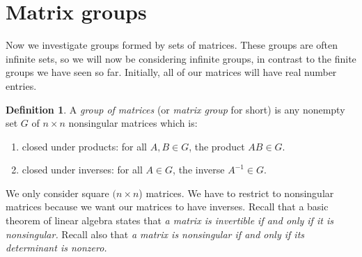 \documentclass[11pt]{article}
\theoremstyle{definition}
\newtheorem{defn}[thm]{Definition}
\begin{document}
\setcounter{section}{13}


\section{Matrix groups}\noindent
Now we investigate groups formed by sets of matrices. These groups are
often infinite sets, so we will now be considering infinite groups, in
contrast to the finite groups we have seen so far. Initially, all of
our matrices will have real number entries.

\begin{defn}
  A \emph{group of matrices} (or \emph{matrix group} for short) is any
  nonempty set $G$ of $n \times n$ nonsingular matrices which is:
  \begin{enumerate}
  \item closed under products: for all $A,B \in G$, the product $AB
    \in G$.
  \item closed under inverses: for all $A \in G$, the inverse $A^{-1}
    \in G$.
  \end{enumerate}
\end{defn}

We only consider square $(n \times n$) matrices.  We have to restrict
to nonsingular matrices because we want our matrices to have
inverses. Recall that a basic theorem of linear algebra states that
\emph{a matrix is invertible if and only if it is nonsingular.} Recall
also that \emph{a matrix is nonsingular if and only if its determinant
  is nonzero.}
\end{document}
